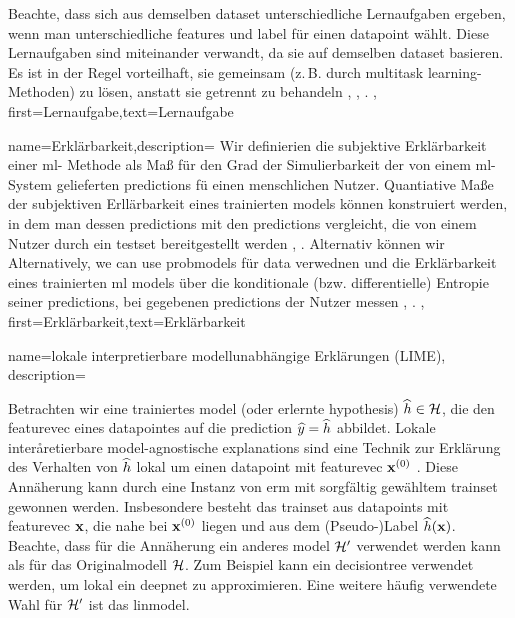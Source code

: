 {{{{{{{{				Beachte, dass sich aus demselben \gls{dataset} unterschiedliche Lernaufgaben ergeben, wenn man 
				unterschiedliche \gls{feature}s und \gls{label} für einen \gls{datapoint} wählt. 
				Diese Lernaufgaben sind miteinander verwandt, da sie auf demselben \gls{dataset} basieren. 
				Es ist in der Regel vorteilhaft, sie gemeinsam (z. B. durch \gls{multitask learning}-Methoden) 
				zu lösen, anstatt sie getrennt zu behandeln \cite{Caruana:1997wk}, \cite{JungGaphLassoSPL}, \cite{CSGraphSelJournal}.
				},
				first={Lernaufgabe},text={Lernaufgabe}
			}
		
		
			{name={Erklärbarkeit},description=
				{Wir  definierien die subjektive Erklärbarkeit einer \gls{ml}- Methode als Maß für den Grad der 
						Simulierbarkeit \cite{Colin:2022aa} der von einem \gls{ml}- System gelieferten \glspl{prediction} fü einen menschlichen Nutzer. Quantiative Maße der subjektiven Erllärbarkeit eines trainierten \gls{model}s können konstruiert werden, in dem man dessen 
						\glspl{prediction} mit den \glspl{prediction} vergleicht, die von einem Nutzer durch ein \gls{testset} bereitgestellt werden \cite{Colin:2022aa}, \cite{Zhang:2024aa}. 
						Alternativ können wir 
						Alternatively, we can use \glspl{probmodel} für  \gls{data} verwednen und die Erklärbarkeit eines trainierten \gls{ml} 
						\gls{model}s über die konditionale (bzw. differentielle) Entropie seiner  \glspl{prediction}, bei gegebenen \glspl{prediction} der Nutzer messen \cite{JunXML2020}, \cite{Chen2018}. 
					},
					first={Erklärbarkeit},text={Erklärbarkeit}
				}
				
				
				{name={lokale interpretierbare modellunabhängige Erklärungen (LIME)},
					description={
						Betrachten wir  eine trainiertes  \gls{model} (oder erlernte \gls{hypothesis}) $\widehat{h} \in \mathcal{H}$, die den \gls{featurevec} eines  \gls{datapoint}es auf die \gls{prediction} $\widehat{y}= \widehat{h}$ abbildet. 
						Lokale interåretierbare \gls{model}-agnostische \glspl{explanation} sind eine Technik zur Erklärung des Verhalten von $\widehat{h}$ 
						lokal um einen \gls{datapoint} mit \gls{featurevec} ${\bf x}^{(0)}$ \cite{Ribeiro2016}. 
						Diese Annäherung kann durch eine Instanz von \gls{erm} mit sorgfältig gewähltem \gls{trainset} gewonnen werden. 
						Insbesondere besteht das \gls{trainset} aus \glspl{datapoint} mit \gls{featurevec} ${\bf x}$, die nahe bei 
						${\bf x}^{(0)}$ liegen und  aus dem (Pseudo-)Label $\widehat{h}({\bf x})$. 
						Beachte, dass für die Annäherung ein anderes \gls{model} $\mathcal{H}'$ verwendet werden kann als für das Originalmodell $\mathcal{H}$. 
						Zum Beispiel kann ein \gls{decisiontree} verwendet werden, um lokal ein \gls{deepnet} zu approximieren. 
						Eine weitere häufig verwendete Wahl für $\mathcal{H}'$ ist das \gls{linmodel}.
					
}}}}}}}}
